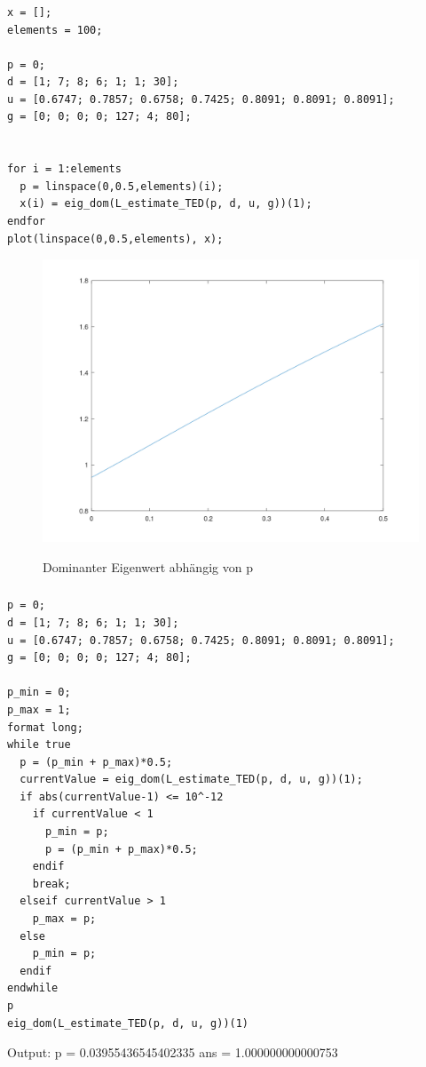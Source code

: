 \documentclass{article}
\begin{document}
\normalsize

\subsubsection{}
\begin{lstlisting}
x = [];
elements = 100;

p = 0;
d = [1; 7; 8; 6; 1; 1; 30];
u = [0.6747; 0.7857; 0.6758; 0.7425; 0.8091; 0.8091; 0.8091];
g = [0; 0; 0; 0; 127; 4; 80];


for i = 1:elements
  p = linspace(0,0.5,elements)(i);
  x(i) = eig_dom(L_estimate_TED(p, d, u, g))(1);
endfor
plot(linspace(0,0.5,elements), x);
\end{lstlisting}

\begin{figure}[H]
\centering
\includegraphics[scale=0.3]{dom_eig_abh_p_KARETT.png}
\label{fig:universe}
\caption{Dominanter Eigenwert abhängig von p}
\end{figure}

\subsubsection{}
\begin{lstlisting}
p = 0;
d = [1; 7; 8; 6; 1; 1; 30];
u = [0.6747; 0.7857; 0.6758; 0.7425; 0.8091; 0.8091; 0.8091];
g = [0; 0; 0; 0; 127; 4; 80];

p_min = 0;
p_max = 1;
format long;
while true
  p = (p_min + p_max)*0.5;
  currentValue = eig_dom(L_estimate_TED(p, d, u, g))(1);
  if abs(currentValue-1) <= 10^-12
    if currentValue < 1
      p_min = p;
      p = (p_min + p_max)*0.5;
    endif
    break;
  elseif currentValue > 1
    p_max = p;
  else
    p_min = p;
  endif
endwhile
p
eig_dom(L_estimate_TED(p, d, u, g))(1)
\end{lstlisting}
Output:
    p = 0.03955436545402335
    ans = 1.000000000000753
\end{document}
